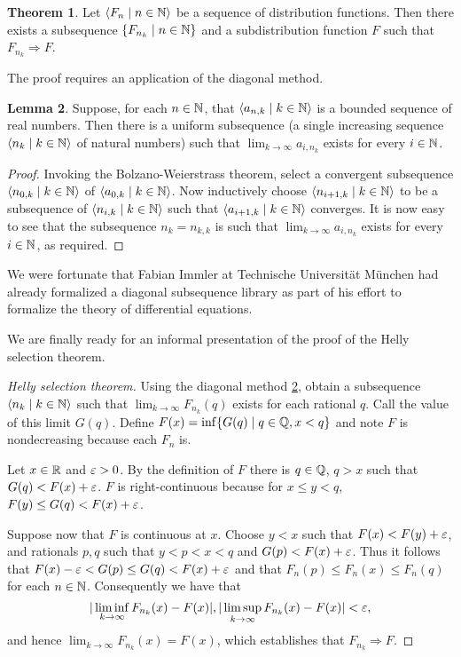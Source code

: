 \documentclass[leqno]{article}
\theoremstyle{definition}
\newtheorem{theorem}{Theorem}[section]
\newtheorem{lemma}[theorem]{Lemma}
\newcommand{\bldset}[2]{\{{#1}\mid{#2}\}}
\newcommand{\bldseq}[2]{\langle{#1}\mid{#2}\rangle}
\begin{document}
\begin{theorem}
Let $\bldseq{F_n}{n \in \N}$ be a sequence of distribution functions. Then there exists a subsequence $\bldset{F_{n_k}}{n \in \N}$ and a subdistribution function $F$ such that $F_{n_k} \Rightarrow F$.
\end{theorem}

The proof requires an application of the diagonal method.

\begin{lemma} \label{lem:diag}
Suppose, for each $n \in \mathbb{N}$, that $\bldseq{a_{n,k}}{k \in \N}$ is a bounded sequence of real numbers. Then there is a uniform subsequence (a single increasing sequence $\bldseq{n_k}{k \in \N}$ of natural numbers) such that $\lim_{k \rightarrow \infty} a_{i,n_k}$ exists for every $i \in \mathbb{N}$.
\end{lemma}

\begin{proof}
Invoking the Bolzano-Weierstrass theorem, select a convergent subsequence $\bldseq{n_{0,k}}{k \in \N}$ of $\bldseq{a_{0,k}}{k \in \N}$. Now inductively choose $\bldseq{n_{i+1,k}}{k \in \N}$ to be a subsequence of $\bldseq{n_{i,k}}{k \in \N}$ such that $\bldseq{a_{i+1,k}}{k \in \N}$ converges. It is now easy to see that the subsequence $n_k = n_{k,k}$ is such that $\lim_{k \rightarrow \infty} a_{i,n_k}$ exists for every $i \in \mathbb{N}$, as required.
\end{proof}

We were fortunate that Fabian Immler at Technische Universit\"at M\"unchen had already formalized a diagonal subsequence library as part of his effort to formalize the theory of differential equations.

We are finally ready for an informal presentation of the proof of the Helly selection theorem.

\begin{proof}[Helly selection theorem]
Using the diagonal method \ref{lem:diag}, obtain a subsequence $\bldseq{n_k}{k \in \N}$ such that $\lim_{k \rightarrow \infty} F_{n_k}(q)$ exists for each rational $q$. Call the value of this limit $G(q)$. Define $F(x) = \inf \bldset{G(q)}{q \in \Q, x < q}$ and note $F$ is nondecreasing because each $F_n$ is.

Let $x \in \mathbb{R}$ and $\varepsilon > 0$. By the definition of $F$ there is $q \in \mathbb{Q}$, $q > x$ such that $G(q) < F(x) + \varepsilon$. $F$ is right-continuous because for $x \le y < q$, $F(y) \le G(q) < F(x) + \varepsilon$.

Suppose now that $F$ is continuous at $x$. Choose $y < x$ such that $F(x) < F(y) + \varepsilon$, and rationals $p,q$ such that $y < p < x < q$ and $G(p) < F(x) + \varepsilon$. Thus it follows that $F(x) - \varepsilon < G(p) \le G(q) < F(x) + \varepsilon$ and that $F_n(p) \le F_n(x) \le F_n(q)$ for each $n \in \mathbb{N}$. Consequently we have that
\[ |\liminf_{k \rightarrow \infty} F_{n_k}(x) - F(x)|, |\limsup_{k \rightarrow \infty} F_{n_k}(x) - F(x)| < \varepsilon, \]
and hence $\lim_{k \rightarrow \infty} F_{n_k}(x) = F(x)$, which establishes that $F_{n_k} \Rightarrow F$.
\end{proof}
\end{document}
